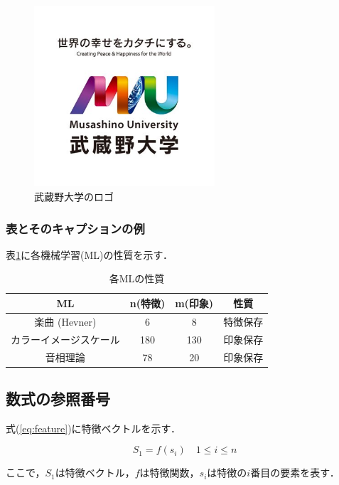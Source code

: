 \documentclass[titlepage,12pt]{ltjsarticle}
\begin{document}
\begin{figure}[htbp]
    \centering
    \includegraphics[width=0.6\textwidth]{logo.jpg}
    \caption{武蔵野大学のロゴ}
    \label{fig:logo}
\end{figure}

\subsubsection{表とそのキャプションの例}\label{subsubsec:table}
表\ref{tab:ml_properties}に各機械学習(ML)の性質を示す．

\begin{table}[htbp]
    \caption{各MLの性質}
    \centering
    \begin{tabular}{|c|c|c|c|}
        \hline
        ML & n(特徴) & m(印象) & 性質 \\ \hline
        楽曲 (Hevner) & 6 & 8 & 特徴保存 \\ \hline
        カラーイメージスケール & 180 & 130 & 印象保存 \\ \hline
        音相理論 & 78 & 20 & 印象保存 \\ \hline
    \end{tabular}
    \label{tab:ml_properties}
\end{table}

\subsection{数式の参照番号}
式(\ref{eq:feature})に特徴ベクトルを示す．

\begin{equation}\label{eq:feature}
    S_1 = f(s_i) \quad 1 \leq i \leq n
\end{equation}

ここで，$S_1$は特徴ベクトル，$f$は特徴関数，$s_i$は特徴の$i$番目の要素を表す．
\end{document}
